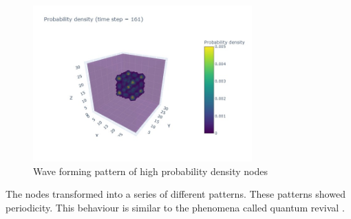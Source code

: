 \begin{figure}
	\includegraphics[width=0.75\textwidth]{"figures/probability_density161.jpeg"}
	\caption{Wave forming pattern of high probability density nodes}
	\label{fig:node_pattern}
\end{figure}

The nodes transformed into a series of different patterns.
These patterns showed periodicity.
This behaviour is similar to the phenomena called quantum revival \cite{styer2001quantum}.






